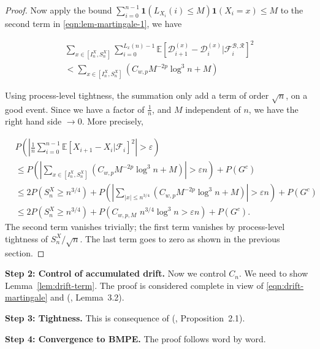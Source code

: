\begin{proof}
Now apply the bound $\sum_{i = 0}^{n-1} \mathbf{1}\left( L_{X_i}(i) \le M \right) \mathbf{1}(X_i = x) \le  M$ to the second term in \eqref{eqn:lem-martingale-1}, we have

\begin{multline}
	\sum_{x \in \left[ I_n^X, S_n^X \right]} \sum_{i = 0}^{L_x(n) - 1} \mathbb{E}\left[ \mathcal{D}_{i+1}^{(x)} - \mathcal{D}_i^{(x)} | \mathcal{F}_{i}^{\mathcal{B}, \mathcal{R}} \right]^2 \\
	< \sum_{x \in \left[ I_n^X, S_n^X \right]} (C_{w, p} M^{-2p} \log^3 n +M )
\end{multline}

Using process-level tightness, the summation only add a term of order $\sqrt{n}$, on a good event. Since we have a factor of $\frac{1}{n}$, and $M$ independent of $n$, we have the right hand side $\to 0$. More precisely,

\begin{align*}
	 &P\left( \left| \frac{1}{n} \sum_{i = 0}^{n-1} \mathbb{E}\left[ X_{i+1} - X_i | \mathcal{F}_i \right]^2  \right|  > \varepsilon \right)\\
	 &\le P\left( \left| \sum_{x \in \left[ I_n^X, S_n^X \right]} (C_{w, p} M^{-2p} \log^3 n +M ) \right| > \varepsilon  n \right) + P(G^c) \\
	 &\le 2 P\left( S_n^X \ge n^{3 / 4} \right) + P\left(  \left| \sum_{|x| \le n^{3 / 4}} (C_{w, p} M^{-2p} \log^3 n +M ) \right| > \varepsilon  n  \right) +P(G^c)  \\
	 &\le 2 P\left( S_n^X \ge n^{3 / 4} \right) + P\left(  C_{w, p, M} \,\, n^{3 / 4} \log^3 n > \varepsilon  n  \right) + P(G^c)
.\end{align*}
The second term vanishes trivially; the first term vanishes by process-level tightness of $S_n^X / \sqrt{n} $. The last term goes to zero as shown in the previous section.

\end{proof}

\textbf{Step 2: Control of accumulated drift.} Now we control $C_n$. We need to show Lemma~\ref{lem:drift-term}. The proof is considered complete in view of \eqref{eqn:drift-martingale} and (\cite{wangLocalDrift2023}, Lemma~3.2).

\textbf{Step 3: Tightness.} This is consequence of (\cite{kosyginaConvergenceNonconvergenceScaled2022}, Proposition~2.1). 

\textbf{Step 4: Convergence to BMPE.} The proof follows word by word.


